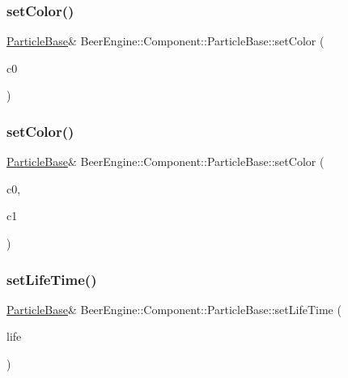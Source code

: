 \subsubsection{\texorpdfstring{set\+Color()}{setColor()}\hspace{0.1cm}{\footnotesize\ttfamily [1/2]}}
{\footnotesize\ttfamily \mbox{\hyperlink{class_beer_engine_1_1_component_1_1_particle_base}{Particle\+Base}}\& Beer\+Engine\+::\+Component\+::\+Particle\+Base\+::set\+Color (\begin{DoxyParamCaption}\item[{glm\+::vec4}]{c0 }\end{DoxyParamCaption})}

\mbox{\label{class_beer_engine_1_1_component_1_1_particle_base_a1d89c8ce8200884d73281f1b4a27ba9a}} 
\subsubsection{\texorpdfstring{set\+Color()}{setColor()}\hspace{0.1cm}{\footnotesize\ttfamily [2/2]}}
{\footnotesize\ttfamily \mbox{\hyperlink{class_beer_engine_1_1_component_1_1_particle_base}{Particle\+Base}}\& Beer\+Engine\+::\+Component\+::\+Particle\+Base\+::set\+Color (\begin{DoxyParamCaption}\item[{glm\+::vec4}]{c0,  }\item[{glm\+::vec4}]{c1 }\end{DoxyParamCaption})}

\mbox{\label{class_beer_engine_1_1_component_1_1_particle_base_a7f4789dd5c5e53652abf2083d7a8e2f9}} 
\subsubsection{\texorpdfstring{set\+Life\+Time()}{setLifeTime()}}
{\footnotesize\ttfamily \mbox{\hyperlink{class_beer_engine_1_1_component_1_1_particle_base}{Particle\+Base}}\& Beer\+Engine\+::\+Component\+::\+Particle\+Base\+::set\+Life\+Time (\begin{DoxyParamCaption}\item[{G\+Lfloat}]{life }\end{DoxyParamCaption})}

